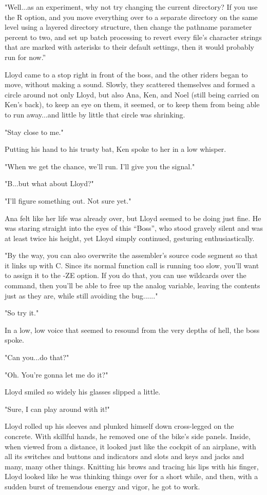 \documentclass[
]{article}
\begin{document}
"Well...as an experiment, why not try changing the current directory? If
you use the R option, and you move everything over to a separate
directory on the same level using a layered directory structure, then
change the pathname parameter percent to two, and set up batch
processing to revert every file's character strings that are marked with
asterisks to their default settings, then it would probably run for
now.''

Lloyd came to a stop right in front of the boss, and the other riders
began to move, without making a sound. Slowly, they scattered themselves
and formed a circle around not only Lloyd, but also Ana, Ken, and Noel
(still being carried on Ken's back), to keep an eye on them, it seemed,
or to keep them from being able to run away...and little by little that
circle was shrinking.

"Stay close to me."

Putting his hand to his trusty bat, Ken spoke to her in a low whisper.

"When we get the chance, we'll run. I'll give you the signal."

"B...but what about Lloyd?"

"I'll figure something out. Not sure yet."

Ana felt like her life was already over, but Lloyd seemed to be doing
just fine. He was staring straight into the eyes of this ``Boss'', who
stood gravely silent and was at least twice his height, yet Lloyd simply
continued, gesturing enthusiastically.

"By the way, you can also overwrite the assembler's source code segment
so that it links up with C. Since its normal function call is running
too slow, you'll want to assign it to the -ZE option. If you do that,
you can use wildcards over the command, then you'll be able to free up
the analog variable, leaving the contents just as they are, while still
avoiding the bug......"

"So try it."

In a low, low voice that seemed to resound from the very depths of hell,
the boss spoke.

"Can you...do that?"

"Oh. You're gonna let me do it?"

Lloyd smiled so widely his glasses slipped a little.

"Sure, I can play around with it!"

Lloyd rolled up his sleeves and plunked himself down cross-legged on the
concrete. With skillful hands, he removed one of the bike's side panels.
Inside, when viewed from a distance, it looked just like the cockpit of
an airplane, with all its switches and buttons and indicators and slots
and keys and jacks and many, many other things. Knitting his brows and
tracing his lips with his finger, Lloyd looked like he was thinking
things over for a short while, and then, with a sudden burst of
tremendous energy and vigor, he got to work.
\end{document}
